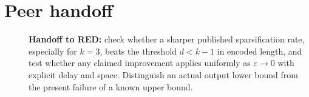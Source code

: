 \documentclass[11pt]{article}
\begin{document}
\section{Peer handoff}
\begin{description}
\item[] \textbf{Handoff to RED:} check whether a sharper published
sparsification rate, especially for $k=3$, beats the threshold
$d<k-1$ in encoded length, and test whether any claimed improvement applies
uniformly as $\varepsilon\to0$ with explicit delay and space.  Distinguish an
actual output lower bound from the present failure of a known upper bound.
\end{description}



\end{document}
